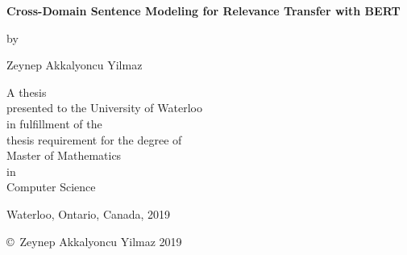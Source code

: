 \pagestyle{empty}

\begin{titlepage}
        \begin{center}
        \vspace*{1.0cm}

        \Huge
        {\bf Cross-Domain Sentence Modeling for Relevance Transfer with BERT}

        \vspace*{1.0cm}

        \normalsize
        by \\

        \vspace*{1.0cm}

        \Large
        Zeynep Akkalyoncu Yilmaz \\

        \vspace*{3.0cm}

        \normalsize
        A thesis \\
        presented to the University of Waterloo \\ 
        in fulfillment of the \\
        thesis requirement for the degree of \\
        Master of Mathematics \\
        in \\
        Computer Science \\

        \vspace*{2.0cm}

        Waterloo, Ontario, Canada, 2019 \\

        \vspace*{1.0cm}

        \copyright\ Zeynep Akkalyoncu Yilmaz 2019 \\
        \end{center}
\end{titlepage}

\pagestyle{plain}
\setcounter{page}{2}

